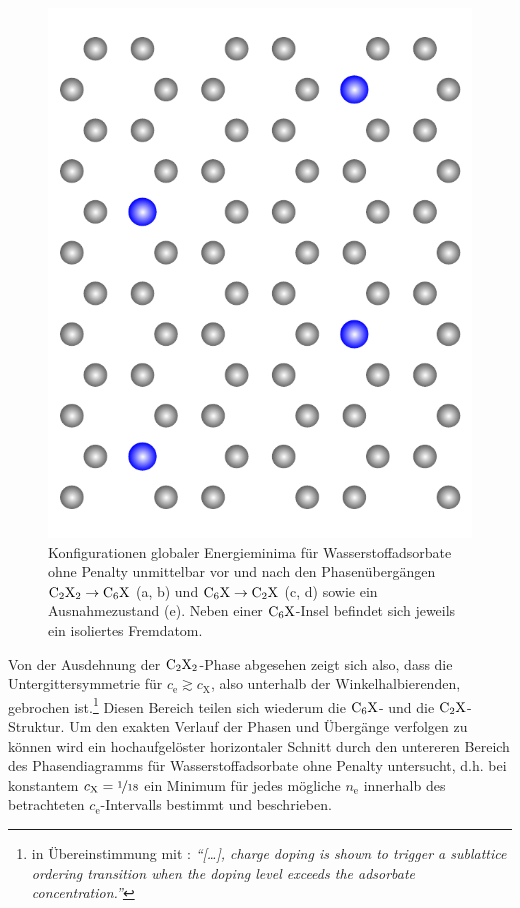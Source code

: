 \documentclass[a4paper, 10pt, twoside, openany]{book} %
\def \nE {n_\mathrm{e}}
\def \cE {c_\mathrm{e}}
\def \cX {c_\mathrm{X}}
\begin{document}
\begin{figure}
\begin{minipage}[b]{0.19\textwidth}
			\includegraphics[width=\textwidth]{Abbildungen/ne108.pdf}
			\subcaption{$\nE = 108$}
		\end{minipage}
		\caption[Konfigurationen globaler Energieminima]{Konfigurationen globaler Energieminima für Wasserstoffadsorbate ohne Penalty unmittelbar vor und nach den Phasenübergängen $\rm C_2X_2 \rightarrow \rm C_6X$ (a, b) und $\rm C_6X \rightarrow C_2X$ (c, d) sowie ein Ausnahmezustand (e). Neben einer $\rm C_6X$-Insel befindet sich jeweils ein isoliertes Fremdatom.}
		\label{Phasenvergleich exakt}
	\end{figure}
	Von der Ausdehnung der $\rm C_2X_2$-Phase abgesehen zeigt sich also, dass die Untergittersymmetrie für $\cE \gtrsim \cX$, also unterhalb der Winkelhalbierenden, gebrochen ist.\footnote{in Übereinstimmung mit \cite[S. 1]{Wehling2}: \emph{"`\emph{[\dots]}, charge doping is shown to trigger a sublattice ordering transition when the doping level exceeds the adsorbate concentration."'}} Diesen Bereich teilen sich wiederum die $\rm C_6X$- und die $\rm C_2X$-Struktur. Um den exakten Verlauf der Phasen und Übergänge verfolgen zu können wird ein hochaufgelöster horizontaler Schnitt durch den untereren Bereich des Phasendiagramms für Wasserstoffadsorbate ohne Penalty untersucht, d.h. bei konstantem $\cX = \nicefrac 1 {18}$ ein Minimum für jedes mögliche $\nE$ innerhalb des betrachteten $\cE$-Intervalls bestimmt und beschrieben.
	
\end{document}
